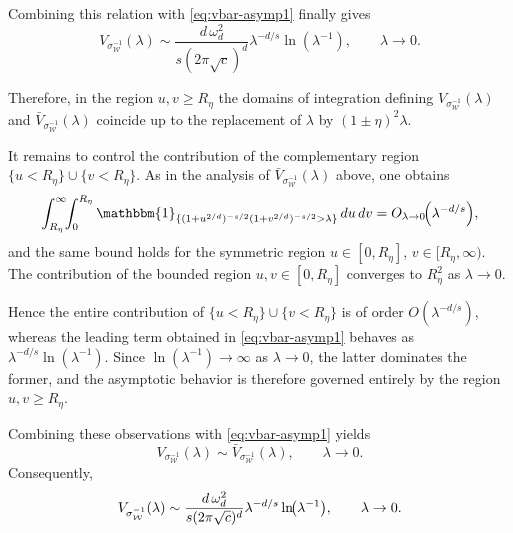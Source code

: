 \documentclass[a4paper,12pt]{article}
\let\originalleft\left
\let\originalright\right
\renewcommand{\left}{\mathopen{}\mathclose\bgroup\originalleft}
\renewcommand{\right}{\aftergroup\egroup\originalright}
\newcommand{\symbolnotsobw}{\symbolnot_{\mathcal{W}}}
\newcommand{\symbolnot}{\sigma}
\begin{document}
Combining this relation with \eqref{eq:vbar-asymp1} finally gives
\begin{equation}\label{eq:asymp-vol-case-r-equals-s}
V_{\symbolnotsobw^{-1}}(\lambda)
\sim
\frac{d\,\omega_d^2}{s(2\pi\sqrt{c})^{d}}
\lambda^{-d/s}\ln(\lambda^{-1}),
\qquad \lambda\to0 .
\end{equation}




Therefore, in the region $u,v\ge R_\eta$ the domains of integration
defining $V_{\symbolnotsobw^{-1}}(\lambda)$ and
$\bar V_{\symbolnotsobw^{-1}}(\lambda)$ coincide up to the replacement
of $\lambda$ by $(1\pm\eta)^2\lambda$.

It remains to control the contribution of the complementary region
$\{u<R_\eta\}\cup\{v<R_\eta\}$.
As in the analysis of $\bar V_{\symbolnotsobw^{-1}}(\lambda)$ above,
one obtains
\[
\int_{R_\eta}^{\infty}\!\!\int_0^{R_\eta}
\mathbbm{1}_{\{(1+u^{2/d})^{-s/2}(1+v^{2/d})^{-s/2}>\lambda\}}
\,du\,dv
=
O_{\lambda\to0}\!\left(\lambda^{-d/s}\right),
\]
and the same bound holds for the symmetric region
$u\in[0,R_\eta],\,v\in[R_\eta,\infty)$.
The contribution of the bounded region
$u,v\in[0,R_\eta]$ converges to $R_\eta^2$ as $\lambda\to0$.

Hence the entire contribution of
$\{u<R_\eta\}\cup\{v<R_\eta\}$ is of order
$O(\lambda^{-d/s})$, whereas the leading term obtained in
\eqref{eq:vbar-asymp1} behaves as
$\lambda^{-d/s}\ln(\lambda^{-1})$.
Since $\ln(\lambda^{-1})\to\infty$ as $\lambda\to0$, the latter
dominates the former, and the asymptotic behavior is therefore
governed entirely by the region $u,v\ge R_\eta$.


Combining these observations with \eqref{eq:vbar-asymp1} yields
\[
V_{\symbolnotsobw^{-1}}(\lambda)
\sim
\bar V_{\symbolnotsobw^{-1}}(\lambda),
\qquad \lambda\to0 .
\]
Consequently,
\begin{equation}\label{eq:asymp-vol-case-r-equals-s}
V_{\symbolnotsobw^{-1}}(\lambda)
\sim
\frac{d\,\omega_d^2}{s(2\pi\sqrt{c})^{d}}
\lambda^{-d/s}\ln\!\left(\lambda^{-1}\right),
\qquad \lambda\to0 .
\end{equation}
\end{document}
